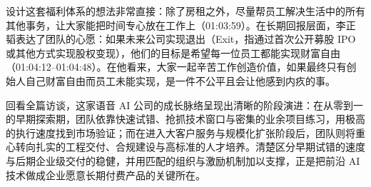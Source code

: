 \documentclass[UTF8,a4paper,11pt,fontset=fandol]{ctexart}
\begin{document}
设计这套福利体系的想法非常直接：除了房租之外，尽量帮员工解决生活中的所有其他事务，让大家能把时间专心放在工作上（01:03:59）。在长期回报层面，李正韬表达了团队的心愿：如果未来公司实现退出（Exit，指通过首次公开募股 IPO 或其他方式实现股权变现），他们的目标是希望每一位员工都能实现财富自由（01:04:12–01:04:48）。在他看来，大家一起辛苦工作创造价值，如果最终只有创始人自己财富自由而员工未能实现，是一件不公平且会让他感到内疚的事。

回看全篇访谈，这家语音 AI 公司的成长脉络呈现出清晰的阶段演进：在从零到一的早期探索期，团队依靠快速试错、抢抓技术窗口与密集的业余项目练习，用极高的执行速度找到市场验证；而在进入大客户服务与规模化扩张阶段后，团队则将重心转向扎实的工程交付、合规建设与高标准的人才培养。清楚区分早期试错的速度与后期企业级交付的稳健，并用匹配的组织与激励机制加以支撑，正是把前沿 AI 技术做成企业愿意长期付费产品的关键所在。
\end{document}
